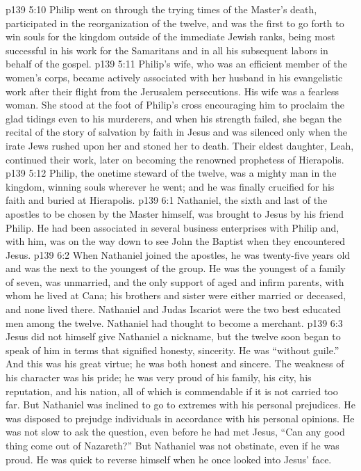 \vs p139 5:10 Philip went on through the trying times of the Master’s death, participated in the reorganization of the twelve, and was the first to go forth to win souls for the kingdom outside of the immediate Jewish ranks, being most successful in his work for the Samaritans and in all his subsequent labors in behalf of the gospel.
\pc \vs p139 5:11 Philip’s wife, who was an efficient member of the women’s corps, became actively associated with her husband in his evangelistic work after their flight from the Jerusalem persecutions. His wife was a fearless woman. She stood at the foot of Philip’s cross encouraging him to proclaim the glad tidings even to his murderers, and when his strength failed, she began the recital of the story of salvation by faith in Jesus and was silenced only when the irate Jews rushed upon her and stoned her to death. Their eldest daughter, Leah, continued their work, later on becoming the renowned prophetess of Hierapolis.
\pc \vs p139 5:12 Philip, the onetime steward of the twelve, was a mighty man in the kingdom, winning souls wherever he went; and he was finally crucified for his faith and buried at Hierapolis.
%
\vs p139 6:1 Nathaniel, the sixth and last of the apostles to be chosen by the Master himself, was brought to Jesus by his friend Philip. He had been associated in several business enterprises with Philip and, with him, was on the way down to see John the Baptist when they encountered Jesus.
\vs p139 6:2 When Nathaniel joined the apostles, he was twenty\hyp{}five years old and was the next to the youngest of the group. He was the youngest of a family of seven, was unmarried, and the only support of aged and infirm parents, with whom he lived at Cana; his brothers and sister were either married or deceased, and none lived there. Nathaniel and Judas Iscariot were the two best educated men among the twelve. Nathaniel had thought to become a merchant.
\pc \vs p139 6:3 Jesus did not himself give Nathaniel a nickname, but the twelve soon began to speak of him in terms that signified honesty, sincerity. He was “without guile.” And this was his great virtue; he was both honest and sincere. The weakness of his character was his pride; he was very proud of his family, his city, his reputation, and his nation, all of which is commendable if it is not carried too far. But Nathaniel was inclined to go to extremes with his personal prejudices. He was disposed to prejudge individuals in accordance with his personal opinions. He was not slow to ask the question, even before he had met Jesus, “Can any good thing come out of Nazareth?” But Nathaniel was not obstinate, even if he was proud. He was quick to reverse himself when he once looked into Jesus’ face.\plusone
